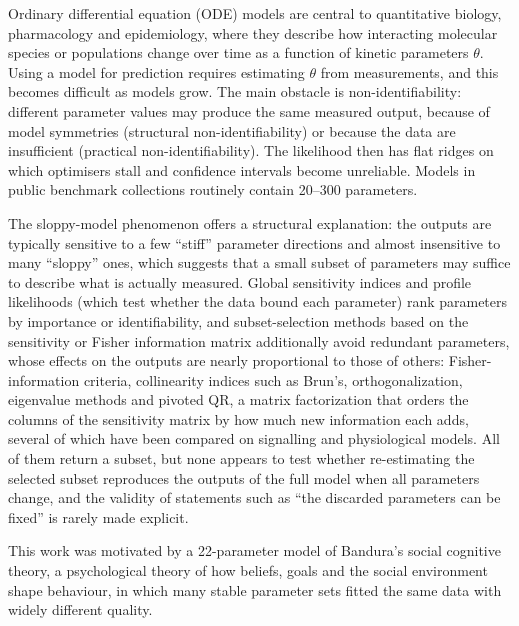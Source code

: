 \documentclass[pdflatex,sn-nature]{sn-jnl}
\theoremstyle{plain}
\begin{document}
Ordinary differential equation (ODE) models are central to quantitative biology, pharmacology and epidemiology, where they describe how interacting molecular species or populations change over time as a function of kinetic parameters $\theta$\cite{bib16}. Using a model for prediction requires estimating $\theta$ from measurements, and this becomes difficult as models grow. The main obstacle is non-identifiability: different parameter values may produce the same measured output, because of model symmetries (structural non-identifiability) or because the data are insufficient (practical non-identifiability)\cite{bib4,bib10,bib29,bib49,bib50}. The likelihood then has flat ridges on which optimisers stall and confidence intervals become unreliable\cite{bib24,bib25,bib17}. Models in public benchmark collections routinely contain 20--300 parameters\cite{bib31}.

The sloppy-model phenomenon offers a structural explanation\cite{bib15,bib41}: the outputs are typically sensitive to a few ``stiff'' parameter directions and almost insensitive to many ``sloppy'' ones\cite{bib53}, which suggests that a small subset of parameters may suffice to describe what is actually measured. Global sensitivity indices\cite{bib26,bib23} and profile likelihoods\cite{bib24,bib37,bib51} (which test whether the data bound each parameter) rank parameters by importance or identifiability, and subset-selection methods based on the sensitivity or Fisher information matrix additionally avoid redundant parameters, whose effects on the outputs are nearly proportional to those of others\cite{bib5}: Fisher-information criteria\cite{bib42,bib46}, collinearity indices such as Brun's\cite{bib9,bib38}, orthogonalization\cite{bib43,bib44,bib45}, eigenvalue methods\cite{bib47} and pivoted QR, a matrix factorization that orders the columns of the sensitivity matrix by how much new information each adds\cite{bib40,bib54}, several of which have been compared on signalling and physiological models\cite{bib47,bib48}. All of them return a subset, but none appears to test whether re-estimating the selected subset reproduces the outputs of the full model when all parameters change, and the validity of statements such as ``the discarded parameters can be fixed'' is rarely made explicit.

This work was motivated by a 22-parameter model of Bandura's social cognitive theory\cite{bib3,bib55,bib56,bib34}, a psychological theory of how beliefs, goals and the social environment shape behaviour, in which many stable parameter sets fitted the same data with widely different quality\cite{bib35}.
\end{document}
